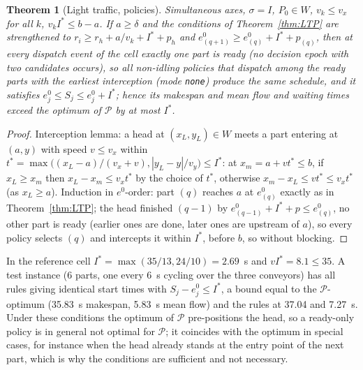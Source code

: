 \documentclass[11pt,a4paper]{article}
\theoremstyle{plain}
\newtheorem{theorem}{Theorem}
\theoremstyle{definition}
\theoremstyle{remark}
\newcommand{\Pb}{\mathcal{P}}
\begin{document}
\begin{theorem}[Light traffic, policies]\label{thm:LTPhi}
Simultaneous axes, $\sigma=I$, $P_0\in W$, $v_k\le v_x$ for all $k$, $v_kI^\ast\le b-a$. If
$a\ge\delta$ and the conditions of Theorem~\ref{thm:LTP} are strengthened to
$r_i\ge r_h+a/v_k+I^\ast+p_h$ and $e^0_{(q+1)}\ge e^0_{(q)}+I^\ast+p_{(q)}$, then at every
dispatch event of the cell exactly one part is ready (no decision epoch with two
candidates occurs), so all non-idling policies that
dispatch among the ready parts with the earliest interception (mode \texttt{none}) produce
the same schedule, and it satisfies $e^0_j\le S_j\le e^0_j+I^\ast$; hence its makespan and
mean flow and waiting times exceed the optimum of $\Pb$ by at most $I^\ast$.
\end{theorem}
\begin{proof}
Interception lemma: a head at $(x_L,y_L)\in W$ meets a part entering at $(a,y)$ with speed
$v\le v_x$ within $t^\ast=\max\bigl((x_L-a)/(v_x+v),|y_L-y|/v_y\bigr)\le I^\ast$: at
$x_m=a+vt^\ast\le b$, if $x_L\ge x_m$ then $x_L-x_m\le v_xt^\ast$ by the choice of $t^\ast$,
otherwise $x_m-x_L\le vt^\ast\le v_xt^\ast$ (as $x_L\ge a$). Induction in $e^0$-order: part
$(q)$ reaches $a$ at $e^0_{(q)}$ exactly as in Theorem~\ref{thm:LTP}; the head finished
$(q-1)$ by $e^0_{(q-1)}+I^\ast+p\le e^0_{(q)}$, no other part is ready (earlier ones are
done, later ones are upstream of $a$), so every policy selects $(q)$ and intercepts it
within $I^\ast$, before $b$, so without blocking.
\end{proof}
In the reference cell $I^\ast=\max(35/13,24/10)=2.69$~s and $vI^\ast=8.1\le35$. A test
instance (6 parts, one every 6~s cycling over the three conveyors) has all rules giving
identical start times with $S_j-e^0_j\le I^\ast$, a bound equal to the $\Pb$-optimum
(35.83~s makespan, 5.83~s mean flow) and the rules at 37.04 and 7.27~s. Under these
conditions the optimum of $\Pb$ pre-positions the head, so a ready-only policy is in
general not optimal for $\Pb$; it coincides with the optimum in special cases, for
instance when the head already stands at the entry point of the next part, which is why
the conditions are sufficient and not necessary.
\end{document}
